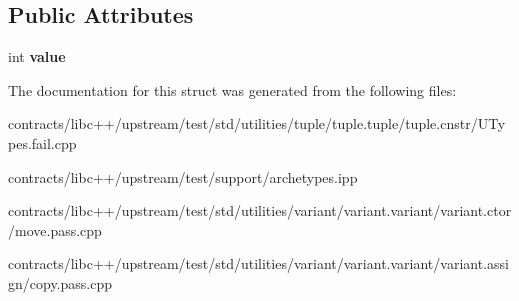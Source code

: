 \subsection*{Public Attributes}
\begin{DoxyCompactItemize}
\item 
\mbox{\label{class_move_only_aceaad17c02e3d19f55b4ce0c1a378403}} 
int {\bfseries value}
\end{DoxyCompactItemize}


The documentation for this struct was generated from the following files\+:\begin{DoxyCompactItemize}
\item 
contracts/libc++/upstream/test/std/utilities/tuple/tuple.\+tuple/tuple.\+cnstr/U\+Types.\+fail.\+cpp\item 
contracts/libc++/upstream/test/support/archetypes.\+ipp\item 
contracts/libc++/upstream/test/std/utilities/variant/variant.\+variant/variant.\+ctor/move.\+pass.\+cpp\item 
contracts/libc++/upstream/test/std/utilities/variant/variant.\+variant/variant.\+assign/copy.\+pass.\+cpp\end{DoxyCompactItemize}
